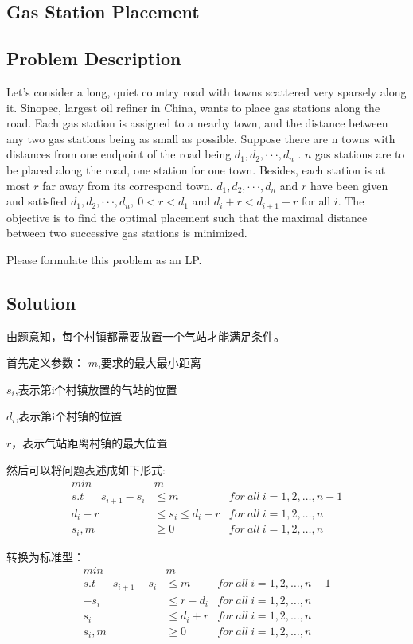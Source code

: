 \documentclass[UTF8,a4paper,12pt]{article}
\begin{document}
\begin{CJK}{UTF8}{gkai}
	
	\newpage
	\newpage
	\section{Gas Station Placement}
	\subsection{Problem Description}
	
		Let’s consider a long, quiet country road with towns scattered very sparsely along it. Sinopec, largest oil refiner in China, wants to place gas stations along the road. Each gas station is assigned to a nearby town, and the distance between any two gas stations being as small as possible. Suppose there are n towns with distances from one endpoint of the road being $d_1 , d_2 , · · · , d_n$ . $ n $ gas stations are to be placed along the road, one station for one town. Besides, each station is at most $ r $ far away from its correspond town. $d_1 , d_2 , · · · , d_n$ and $ r $ have been given and satisfied $d_1 , d_2 , · · · , d_n,\ 0<r<d_1 $ and $ d_i + r < d_{i+1} − r $ for all $ i $. The objective is to find the optimal placement such that the maximal distance between two successive gas stations is minimized.
	
		Please formulate this problem as an LP.
	
	\subsection{Solution}
	
		由题意知，每个村镇都需要放置一个气站才能满足条件。
		
		首先定义参数：
		$ m $,要求的最大最小距离
		
		$ s_{i} $,表示第i个村镇放置的气站的位置
		
		$ d_i $,表示第i个村镇的位置
		
		$ r $，表示气站距离村镇的最大位置
		
		
		然后可以将问题表述成如下形式:
		\begin{align*}
		min\ \ \ \ \ \ \  \ \ \ \  \ \ \ \  & m\\ 
		s.t\ \ \ \ \ \ \  s_{i+1} - s_{i} &\le m&for\ all\ i=1,2,\dots,n-1 \\
		d_i - r &\le s_i \le d_i+r &for\ all\ i=1,2,\dots,n \\
		s_{i},m &\ge 0 &for\ all\ i=1,2,\dots,n
		\end{align*}
		
		转换为标准型：
		\begin{align*}
		min\ \ \ \ \ \ \  \ \ \ \  \ \ \ \  & m\\ 
		s.t\ \ \ \ \ \ \  s_{i+1} - s_{i} &\le m&for\ all\ i=1,2,\dots,n-1 \\
		-s_i &\le r - d_i  &for\ all\ i=1,2,\dots,n \\
		s_i &\le d_i+r &for\ all\ i=1,2,\dots,n \\
		s_{i},m &\ge 0 &for\ all\ i=1,2,\dots,n
		\end{align*}
		

\end{CJK}
\end{document}
